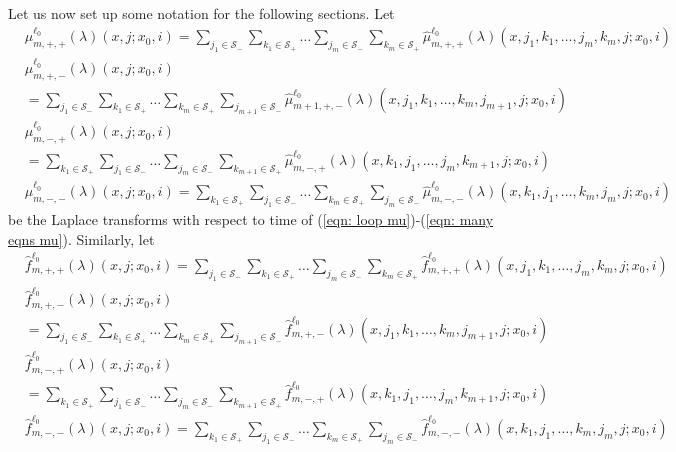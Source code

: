 Let us now set up some notation for the following sections. Let 
\begin{align}
	&\widehat \mu_{m,+,+}^{\ell_0}(\lambda)( x,j;x_0,i) = \sum_{j_1\in\mathcal S_-} \sum_{k_1\in\mathcal S_+}\dots \sum_{j_m\in\mathcal S_-}\sum_{k_m\in\mathcal S_+}\widehat  \mu_{m,+,+}^{\ell_0}(\lambda)( x, j_1,k_1,\dots,j_m,k_m, j; x_0,i)  \label{eqn: mu advh}
	\\&\widehat \mu^{\ell_0}_{m,+,-}(\lambda)( x, j; x_0,i) \nonumber 
	\\&= \sum_{j_1\in\mathcal S_-} \sum_{k_1\in\mathcal S_+}\dots \sum_{k_m\in\mathcal S_+}\sum_{j_{m+1}\in\mathcal S_-}\widehat \mu^{\ell_0}_{m+1,+,-}(\lambda)( x, j_1,k_1,\dots,k_m,j_{m+1}, j; x_0,i)
	\\&\widehat \mu^{\ell_0}_{m,-,+}(\lambda)( x, j; x_0,i) \nonumber 
	\\&= \sum_{k_1\in\mathcal S_+} \sum_{j_1\in\mathcal S_-}\dots \sum_{j_m\in\mathcal S_-}\sum_{k_{m+1}\in\mathcal S_+}\widehat \mu^{\ell_0}_{m,-,+}(\lambda)( x, k_1,j_1,\dots,j_m,k_{m+1}, j; x_0,i) 
	\\&\widehat \mu^{\ell_0}_{m,-,-}(\lambda)( x, j; x_0,i) = \sum_{k_1\in\mathcal S_+} \sum_{j_1\in\mathcal S_-}\dots \sum_{k_m\in\mathcal S_+}\sum_{j_m\in\mathcal S_-}\widehat \mu^{\ell_0}_{m,-,-}(\lambda)( x, k_1, j_1,\dots,k_m,j_m, j; x_0,i) 
\end{align}
be the Laplace transforms with respect to time of (\ref{eqn: loop mu})-(\ref{eqn: many eqns mu}). Similarly, let
\begin{align}
            	&\widehat f^{\ell_0}_{m,+,+}(\lambda)(x,j;x_0,i) = \sum_{j_1\in\mathcal S_-} \sum_{k_1\in\mathcal S_+}\dots \sum_{j_m\in\mathcal S_-}\sum_{k_m\in\mathcal S_+}  \widehat f^{\ell_0}_{m,+,+}(\lambda)( x, j_1,k_1,\dots,j_m,k_m, j; x_0,i)\label{eqn: f advh}
		\\&\widehat f^{\ell_0}_{m,+,-}(\lambda)(x, j; x_0,i)  \nonumber
		\\&= \sum_{j_1\in\mathcal S_-} \sum_{k_1\in\mathcal S_+}\dots \sum_{k_m\in\mathcal S_+}\sum_{j_{m+1}\in\mathcal S_-}\widehat f^{\ell_0}_{m,+,-}(\lambda)(x, j_1,k_1,\dots,k_m,j_{m+1}, j; x_0,i) 
	\\&\widehat f^{\ell_0}_{m,-,+}(\lambda)(x, j; x_0,i) \nonumber
	\\&= \sum_{k_1\in\mathcal S_+} \sum_{j_1\in\mathcal S_-}\dots \sum_{j_m\in\mathcal S_-}\sum_{k_{m+1}\in\mathcal S_+}\widehat f^{\ell_0}_{m,-,+}(\lambda)(x, k_1,j_1,\dots,j_m,k_{m+1}, j; x_0,i)  
	\\&\widehat f^{\ell_0}_{m,-,-}(\lambda)(x, j; x_0,i)  = \sum_{k_1\in\mathcal S_+} \sum_{j_1\in\mathcal S_-}\dots \sum_{k_m\in\mathcal S_+}\sum_{j_m\in\mathcal S_-}\widehat f^{\ell_0}_{m,-,-}(\lambda)(x, k_1, j_1,\dots,k_m,j_m, j; x_0,i)  \label{eqn: asdlgjlll} 
\end{align}
